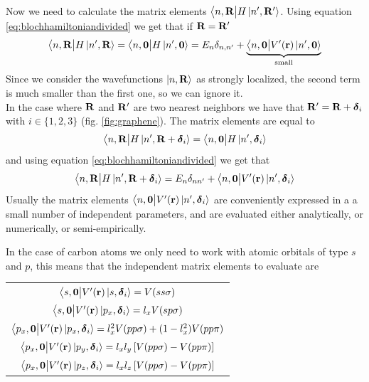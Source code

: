 Now we need to calculate the matrix elements $ \big\langle n,\mathbf{R}\big|H\ket{n',\mathbf{R}'}$. Using equation \ref{eq:blochhamiltoniandivided} we get that if $\mathbf{R}=\mathbf{R}'$
\begin{equation}
    \big\langle n,\mathbf{R}\big|H\ket{n',\mathbf{R}}=
    \big\langle n,\mathbf{0}\big|H\ket{n',\mathbf{0}}=E_n\delta_{n,n'}+
    \underbrace{
        \big\langle n,\mathbf{0}\big|V'(\mathbf{r})\ket{n',\mathbf{0}}
    }_{\text{small}}
    \label{eq:tight1}
\end{equation}
Since we consider the wavefunctions $\ket{n,\mathbf{R}}$ as strongly localized, the second term is much smaller than the first one, so we can ignore it.\\
In the case where $\mathbf{R}$ and $\mathbf{R}'$ are two nearest neighbors we have that $\mathbf{R}'=\mathbf{R}+\boldsymbol\delta_i$ with $i\in \{1,2,3\}$ (fig. \ref{fig:graphene}). The matrix elements are equal to
\begin{equation}
    \big\langle n,\mathbf{R}\big|H\ket{n',\mathbf{R}+\boldsymbol \delta_i}=
    \big\langle n,\mathbf{0}\big|H\ket{n',\boldsymbol \delta_i}
\end{equation}
and using equation \ref{eq:blochhamiltoniandivided} we get that
\begin{equation}
    \big\langle n,\mathbf{R}\big|H\ket{n',\mathbf{R}+\boldsymbol \delta_i}=
    E_n\delta_{nn'}+\big\langle n,\mathbf{0}\big|V'(\mathbf{r})\ket{n',\boldsymbol \delta_i}
\end{equation}
Usually the matrix elements $\big\langle n,\mathbf{0}\big|V'(\mathbf{r})\ket{n',\boldsymbol \delta_i}$ are conveniently expressed in a a small number of independent parameters, and are evaluated either analytically, or numerically, or semi-empirically. 
\renewcommand{\arraystretch}{1.5}


In the case of carbon atoms we only need to work with atomic orbitals of type $s$ and $p$, this means that the independent matrix elements to evaluate are 
\begin{center}
    \begin{tabular}{c}
        \hline
        $\big\langle s,\mathbf{0}\big|V'(\mathbf{r})\ket{s,\boldsymbol \delta_i}=V(ss\sigma)$\\
        $\big\langle s,\mathbf{0}\big|V'(\mathbf{r})\ket{p_x,\boldsymbol \delta_i}=l_xV(sp\sigma)$\\
        $\big\langle p_x,\mathbf{0}\big|V'(\mathbf{r})\ket{p_x,\boldsymbol \delta_i}=l_x^2V(pp\sigma)+(1-l_x^2)V(pp\pi)$\\
        $\big\langle p_x,\mathbf{0}\big|V'(\mathbf{r})\ket{p_y,\boldsymbol \delta_i}=l_xl_y\left[V(pp\sigma)-V(pp\pi)\right]$\\
        $\big\langle p_x,\mathbf{0}\big|V'(\mathbf{r})\ket{p_z,\boldsymbol \delta_i}=l_xl_z\left[V(pp\sigma)-V(pp\pi)\right]$\\
        \hline
    \end{tabular}
\end{center}


